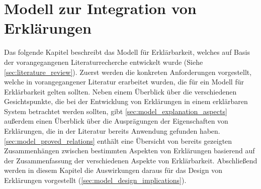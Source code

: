 \chapter{Modell zur Integration von Erklärungen}

Das folgende Kapitel beschreibt das Modell für Erklärbarkeit, welches auf Basis der vorangegangenen Literaturrecherche entwickelt wurde (Siehe \autoref{sec:literature_review}). Zuerst werden die konkreten Anforderungen vorgestellt, welche in vorangegangener Literatur erarbeitet wurden, die für ein Modell für Erklärbarkeit gelten sollten. Neben einem Überblick über die verschiedenen Gesichtspunkte, die bei der Entwicklung von Erklärungen in einem erklärbaren System betrachtet werden sollten, gibt \autoref{sec:model_explanation_aspects} außerdem einen Überblick über die Ausprägungen der Eigenschaften von Erklärungen, die in der Literatur bereits Anwendung gefunden haben. \autoref{sec:model_proved_relations} enthält eine Übersicht von bereits gezeigten Zusammenhängen zwischen bestimmten Aspekten von Erklärungen basierend auf der Zusammenfassung der verschiedenen Aspekte von Erklärbarkeit. Abschließend werden in diesem Kapitel die Auswirkungen daraus für das Design von Erklärungen vorgestellt (\autoref{sec:model_design_implications}).





